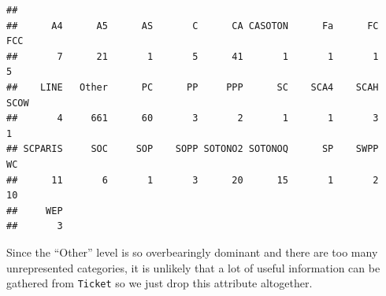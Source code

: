 \documentclass[]{article}
\newenvironment{Shaded}{\begin{snugshade}}{\end{snugshade}}
\newcommand{\KeywordTok}[1]{\textcolor[rgb]{0.13,0.29,0.53}{\textbf{#1}}}
\newcommand{\StringTok}[1]{\textcolor[rgb]{0.31,0.60,0.02}{#1}}
\newcommand{\CommentTok}[1]{\textcolor[rgb]{0.56,0.35,0.01}{\textit{#1}}}
\newcommand{\OtherTok}[1]{\textcolor[rgb]{0.56,0.35,0.01}{#1}}
\newcommand{\OperatorTok}[1]{\textcolor[rgb]{0.81,0.36,0.00}{\textbf{#1}}}
\newcommand{\NormalTok}[1]{#1}
\begin{document}
\begin{Shaded}
\end{Shaded}

\begin{verbatim}
## 
##      A4      A5      AS       C      CA CASOTON      Fa      FC     FCC 
##       7      21       1       5      41       1       1       1       5 
##    LINE   Other      PC      PP     PPP      SC    SCA4    SCAH    SCOW 
##       4     661      60       3       2       1       1       3       1 
## SCPARIS     SOC     SOP    SOPP SOTONO2 SOTONOQ      SP    SWPP      WC 
##      11       6       1       3      20      15       1       2      10 
##     WEP 
##       3
\end{verbatim}

Since the ``Other'' level is so overbearingly dominant and there are too
many unrepresented categories, it is unlikely that a lot of useful
information can be gathered from \texttt{Ticket} so we just drop this
attribute altogether.

\begin{Shaded}
\end{Shaded}
\end{document}
